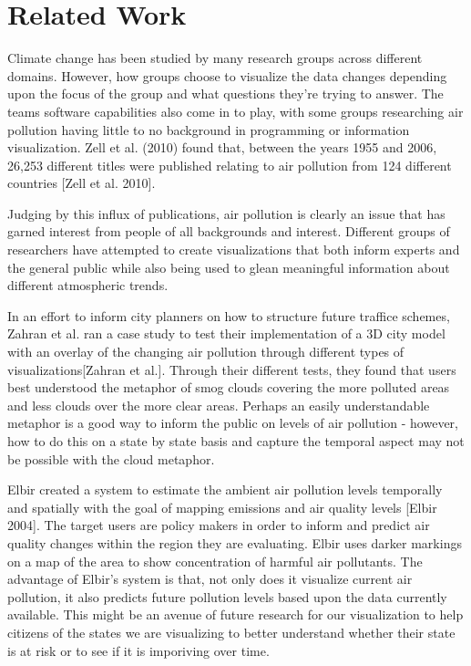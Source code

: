 \documentclass[journal]{vgtc}                %
\begin{document}
\section{Related Work}

Climate change has been studied by many research groups across different domains. However, how groups choose to visualize
the data changes depending upon the focus of the group and what questions they're trying to answer. The teams software
capabilities also come in to play, with some groups researching air pollution having little to no background in 
programming or information visualization. Zell et al. (2010) found that, between the years 1955 and 2006, 
26,253 different titles were published relating to air pollution from 124 different countries [Zell et al. 2010]. 


Judging by this influx of publications, air pollution is clearly an issue that has garned interest from people of all
backgrounds and interest. Different groups of researchers have attempted to create visualizations that both inform
experts and the general public while also being used to glean meaningful information about different atmospheric trends.

In an effort to inform city planners on how to structure future traffice schemes, Zahran et al. ran a case study
to test their implementation of a 3D city model with an overlay of the changing air pollution through different types of
visualizations[Zahran et al.]. Through their different tests, they found that users best understood the metaphor of smog clouds 
covering the more polluted areas and less clouds over the more clear areas.
Perhaps an easily understandable metaphor is a good way to inform the public on levels of air pollution - however, how
to do this on a state by state basis and capture the temporal aspect may not be possible with the cloud metaphor. 

Elbir created a system to estimate the ambient air pollution levels temporally and spatially with the goal of mapping
emissions and air quality levels [Elbir 2004]. 
The target users are policy makers in order to inform and predict air quality changes within the region they are 
evaluating. Elbir uses darker markings on a map of the area to show concentration of harmful air pollutants.
The advantage of Elbir's system is that, not only does it visualize current air pollution, it also predicts future
pollution levels based upon the data currently available. This might be an avenue of future research for our
visualization to help citizens of the states we are visualizing to better understand whether their state is at risk or
to see if it is imporiving over time. 
\end{document}
